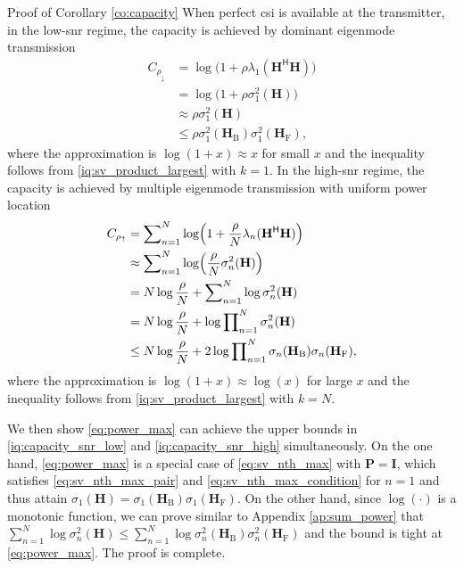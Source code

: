 \documentclass[journal]{IEEEtran}
\begin{document}
\begin{appendix}
	\begin{subsection}{Proof of Corollary \ref{co:capacity}}\label{ap:capacity}
		When perfect \gls{csi} is available at the transmitter, in the low-\gls{snr} regime, the capacity is achieved by dominant eigenmode transmission \cite[(5.26)]{Clerckx2013}
		\begin{align*}
			C_{\rho_\downarrow}
			& = \log\bigl(1 + \rho \lambda_1(\mathbf{H}^\mathsf{H} \mathbf{H})\bigr) \\
			& = \log\bigl(1 + \rho \sigma_1^2(\mathbf{H})\bigr) \\
			& \approx \rho \sigma_1^2(\mathbf{H}) \\
			& \le \rho \sigma_1^2(\mathbf{H}_\mathrm{B}) \sigma_1^2(\mathbf{H}_\mathrm{F}),
		\end{align*}
		where the approximation is $\log(1 + x) \approx x$ for small $x$ and the inequality follows from \eqref{iq:sv_product_largest} with $k=1$.
		In the high-\gls{snr} regime, the capacity is achieved by multiple eigenmode transmission with uniform power location \cite[(5.27)]{Clerckx2013}
		\begin{align*}
			C_{\rho_\uparrow}
			& = \sum\nolimits_{n=1}^N \log\Bigl(1 + \frac{\rho}{N} \lambda_n(\mathbf{H}^\mathsf{H} \mathbf{H})\Bigr) \\
			& \approx \sum\nolimits_{n=1}^N \log\Bigl(\frac{\rho}{N} \sigma_n^2(\mathbf{H})\Bigr) \\
			& = N \log \frac{\rho}{N} + \sum\nolimits_{n=1}^N \log \sigma_n^2(\mathbf{H}) \\
			& = N \log \frac{\rho}{N} + \log \prod\nolimits_{n=1}^N \sigma_n^2(\mathbf{H}) \\
			& \le N \log \frac{\rho}{N} + 2 \log \prod\nolimits_{n=1}^N \sigma_n(\mathbf{H}_\mathrm{B}) \sigma_n(\mathbf{H}_\mathrm{F}),
		\end{align*}
		where the approximation is $\log(1 + x) \approx \log(x)$ for large $x$ and the inequality follows from \eqref{iq:sv_product_largest} with $k=N$.

		We then show \eqref{eq:power_max} can achieve the upper bounds in \eqref{iq:capacity_snr_low} and \eqref{iq:capacity_snr_high} simultaneously.
		On the one hand, \eqref{eq:power_max} is a special case of \eqref{eq:sv_nth_max} with $\mathbf{P} = \mathbf{I}$, which satisfies \eqref{eq:sv_nth_max_pair} and \eqref{eq:sv_nth_max_condition} for $n=1$ and thus attain $\sigma_1(\mathbf{H}) = \sigma_1(\mathbf{H}_\mathrm{B}) \sigma_1(\mathbf{H}_\mathrm{F})$.
		On the other hand, since $\log(\cdot)$ is a monotonic function, we can prove similar to Appendix \ref{ap:sum_power} that $\sum_{n=1}^N \log \sigma_n^2(\mathbf{H}) \le \sum_{n=1}^N \log \sigma_n^2(\mathbf{H}_\mathrm{B}) \sigma_n^2(\mathbf{H}_\mathrm{F})$ and the bound is tight at \eqref{eq:power_max}.
		The proof is complete.
	\end{subsection}


\end{appendix}
\end{document}
